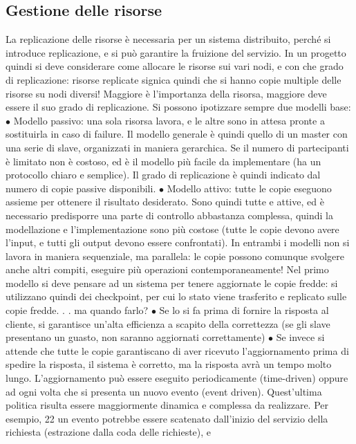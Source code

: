 \subsection{Gestione delle risorse}
La replicazione delle risorse è necessaria per un sistema distribuito, perché si
introduce replicazione, e si può garantire la fruizione del servizio. In un progetto
quindi si deve considerare come allocare le risorse sui vari nodi, e con che grado di replicazione: risorse replicate
signica quindi che si hanno copie multiple
delle risorse su nodi diversi! Maggiore è l'importanza della risorsa, maggiore
deve essere il suo grado di replicazione.
Si possono ipotizzare sempre due modelli base:
$\bullet$ Modello passivo: una sola risorsa lavora, e le altre sono in attesa pronte
a sostituirla in caso di failure. Il modello generale è quindi quello di
un master con una serie di slave, organizzati in maniera gerarchica. Se
il numero di partecipanti è limitato non è costoso, ed è il modello più
facile da implementare (ha un protocollo chiaro e semplice). Il grado di
replicazione è quindi indicato dal numero di copie passive disponibili.
$\bullet$ Modello attivo: tutte le copie eseguono assieme per ottenere il risultato
desiderato. Sono quindi tutte e attive, ed è necessario predisporre una
parte di controllo abbastanza complessa, quindi la modellazione e l'implementazione sono più costose (tutte le copie
devono avere l'input, e tutti
gli output devono essere confrontati).
In entrambi i modelli non si lavora in maniera sequenziale, ma parallela: le
copie possono comunque svolgere anche altri compiti, eseguire più operazioni
contemporaneamente!
Nel primo modello si deve pensare ad un sistema per tenere aggiornate le
copie fredde: si utilizzano quindi dei checkpoint, per cui lo stato viene trasferito
e replicato sulle copie fredde. . . ma quando farlo?
$\bullet$ Se lo si fa prima di fornire la risposta al cliente, si garantisce un'alta
efficienza a scapito della correttezza (se gli slave presentano un guasto,
non saranno aggiornati correttamente)
$\bullet$ Se invece si attende che tutte le copie garantiscano di aver ricevuto l'aggiornamento prima di spedire la
risposta, il sistema è corretto, ma la
risposta avrà un tempo molto lungo.
L'aggiornamento può essere eseguito periodicamente (time-driven) oppure ad
ogni volta che si presenta un nuovo evento (event driven). Quest'ultima politica
risulta essere maggiormente dinamica e complessa da realizzare. Per esempio,
22
un evento potrebbe essere scatenato dall'inizio del servizio della richiesta (estrazione dalla coda delle richieste), e
